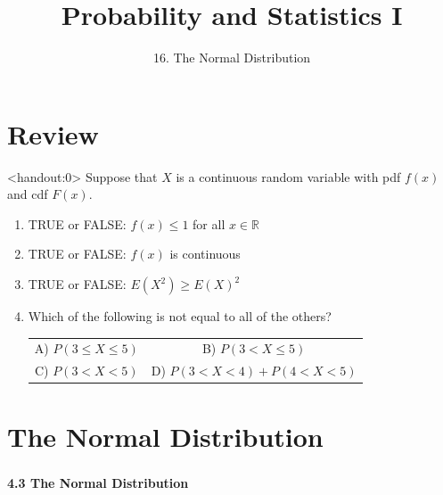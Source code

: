 

\usepackage{enumitem}

\newcommand{\lecturenum}{16}

\title[SS2857]{Probability and Statistics I}
\subtitle{16. The Normal Distribution}

\date{}






{

\begin{frame}
  \addtocounter{framenumber}{-1}

  \maketitle
\end{frame}
}

\section{Review}

\begin{frame}<handout:0>
  Suppose that $X$ is a continuous random variable with pdf $f(x)$ and cdf $F(x)$.
  \begin{enumerate}[label=\alph*),start=1]
  \item TRUE or FALSE: $f(x) \leq 1$ for all $x \in \mathbb R$
  \item TRUE or FALSE: $f(x)$ is continuous
  \item TRUE or FALSE: $E(X^2) \geq E(X)^2$
  \item Which of the following is not equal to all of the others?
    \begin{tabular}{cc}
      A) $P(3 \leq X \leq 5)$ & B) $P(3 < X \leq 5)$\\
      C) $P(3 < X < 5)$ & D) $P(3 < X < 4) + P(4 < X < 5)$
    \end{tabular}
  \end{enumerate}
\end{frame}

\section{The Normal Distribution}

\begin{frame}
  \frametitle{}
  
  \begin{center}
    \Large{\textbf{4.3 The Normal Distribution}}
  \end{center}
  
  \bigskip
  
\end{frame}

